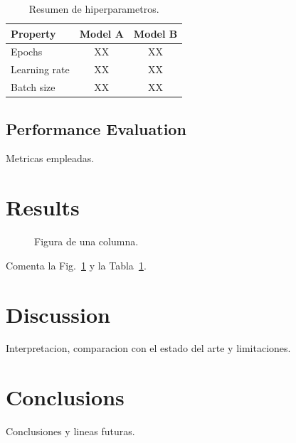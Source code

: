 \documentclass[10pt,conference]{IEEEtran}
\begin{document}
\begin{table}[t]
\centering
\caption{Resumen de hiperparametros.}
\label{tab:hyperparams}
\begin{tabular}{@{}lcc@{}}
\toprule
\textbf{Property} & \textbf{Model A} & \textbf{Model B} \\
\midrule
Epochs        & XX & XX \\
Learning rate & XX & XX \\
Batch size    & XX & XX \\
\bottomrule
\end{tabular}
\end{table}

\subsection{Performance Evaluation}

Metricas empleadas.


\section{Results}

\begin{figure}[t]
\centering
\fbox{\rule{0pt}{3cm}\rule{0.8\linewidth}{0pt}}
\caption{Figura de una columna.}
\label{fig:ejemplo}
\end{figure}


Comenta la Fig.~\ref{fig:ejemplo} y la Tabla~\ref{tab:hyperparams}.


\section{Discussion}

Interpretacion, comparacion con el estado del arte y limitaciones.


\section{Conclusions}

Conclusiones y lineas futuras.




\end{document}
